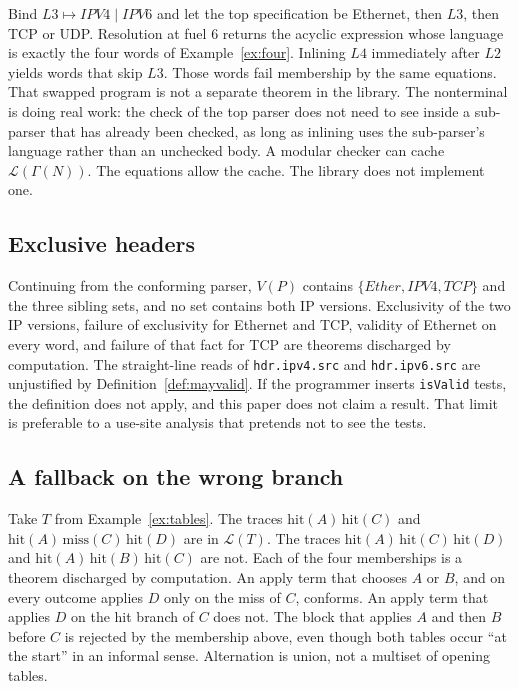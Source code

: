 \documentclass[a4paper,UKenglish,cleveref,autoref]{lipics-v2021}
\begin{document}
Bind \(\mathit{L3} \mapsto \mathit{IPV4} \mid \mathit{IPV6}\) and let the top specification be Ethernet, then \(\mathit{L3}\), then TCP or UDP.
Resolution at fuel \(6\) returns the acyclic expression whose language is exactly the four words of Example~\ref{ex:four}.
Inlining \(\mathit{L4}\) immediately after \(\mathit{L2}\) yields words that skip \(\mathit{L3}\).
Those words fail membership by the same equations.
That swapped program is not a separate theorem in the library.
The nonterminal is doing real work: the check of the top parser does not need to see inside a sub-parser that has already been checked, as long as inlining uses the sub-parser's language rather than an unchecked body.
A modular checker can cache \(\mathcal{L}(\Gamma(N))\).
The equations allow the cache.
The library does not implement one.

\subsection{Exclusive headers}

Continuing from the conforming parser, \(V(P)\) contains \(\{\mathit{Ether},\mathit{IPV4},\mathit{TCP}\}\) and the three sibling sets, and no set contains both IP versions.
Exclusivity of the two IP versions, failure of exclusivity for Ethernet and TCP, validity of Ethernet on every word, and failure of that fact for TCP are theorems discharged by computation.
The straight-line reads of \texttt{hdr.ipv4.src} and \texttt{hdr.ipv6.src} are unjustified by Definition~\ref{def:mayvalid}.
If the programmer inserts \texttt{isValid} tests, the definition does not apply, and this paper does not claim a result.
That limit is preferable to a use-site analysis that pretends not to see the tests.

\subsection{A fallback on the wrong branch}

Take \(T\) from Example~\ref{ex:tables}.
The traces \(\mathrm{hit}(A)\,\mathrm{hit}(C)\) and \(\mathrm{hit}(A)\,\mathrm{miss}(C)\,\mathrm{hit}(D)\) are in \(\mathcal{L}(T)\).
The traces \(\mathrm{hit}(A)\,\mathrm{hit}(C)\,\mathrm{hit}(D)\) and \(\mathrm{hit}(A)\,\mathrm{hit}(B)\,\mathrm{hit}(C)\) are not.
Each of the four memberships is a theorem discharged by computation.
An apply term that chooses \(A\) or \(B\), and on every outcome applies \(D\) only on the miss of \(C\), conforms.
An apply term that applies \(D\) on the hit branch of \(C\) does not.
The block that applies \(A\) and then \(B\) before \(C\) is rejected by the membership above, even though both tables occur ``at the start'' in an informal sense.
Alternation is union, not a multiset of opening tables.
\end{document}
